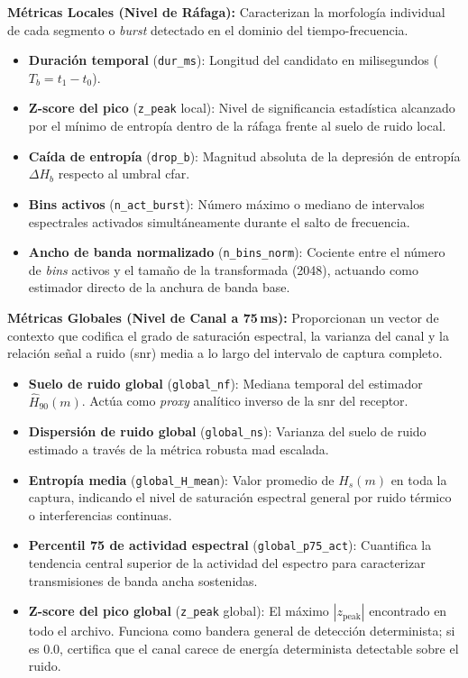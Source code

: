 \textbf{Métricas Locales (Nivel de Ráfaga):}
Caracterizan la morfología individual de cada segmento o \textit{burst} detectado en el dominio del tiempo-frecuencia.
\begin{itemize}\itemsep 0em
    \item \textbf{Duración temporal} (\texttt{dur\_ms}): Longitud del candidato en milisegundos ($T_b = t_1 - t_0$).
    \item \textbf{Z-score del pico} (\texttt{z\_peak} local): Nivel de significancia estadística alcanzado por el mínimo de entropía dentro de la ráfaga frente al suelo de ruido local.
    \item \textbf{Caída de entropía} (\texttt{drop\_b}): Magnitud absoluta de la depresión de entropía $\Delta H_b$ respecto al umbral \gls{cfar}.
    \item \textbf{Bins activos} (\texttt{n\_act\_burst}): Número máximo o mediano de intervalos espectrales activados simultáneamente durante el salto de frecuencia.
    \item \textbf{Ancho de banda normalizado} (\texttt{n\_bins\_norm}): Cociente entre el número de \textit{bins} activos y el tamaño de la transformada (2048), actuando como estimador directo de la anchura de banda base.
\end{itemize}

\textbf{Métricas Globales (Nivel de Canal a 75\,ms):}
Proporcionan un vector de contexto que codifica el grado de saturación espectral, la varianza del canal y la relación señal a ruido (\gls{snr}) media a lo largo del intervalo de captura completo.
\begin{itemize}\itemsep 0em
    \item \textbf{Suelo de ruido global} (\texttt{global\_nf}): Mediana temporal del estimador $\widehat{H}_{90}(m)$. Actúa como \textit{proxy} analítico inverso de la \gls{snr} del receptor.
    \item \textbf{Dispersión de ruido global} (\texttt{global\_ns}): Varianza del suelo de ruido estimado a través de la métrica robusta \gls{mad} escalada.
    \item \textbf{Entropía media} (\texttt{global\_H\_mean}): Valor promedio de $H_s(m)$ en toda la captura, indicando el nivel de saturación espectral general por ruido térmico o interferencias continuas.
    \item \textbf{Percentil 75 de actividad espectral} (\texttt{global\_p75\_act}): Cuantifica la tendencia central superior de la actividad del espectro para caracterizar transmisiones de banda ancha sostenidas.
    \item \textbf{Z-score del pico global} (\texttt{z\_peak} global): El máximo $|z_{\text{peak}}|$ encontrado en todo el archivo. Funciona como bandera general de detección determinista; si es $0.0$, certifica que el canal carece de energía determinista detectable sobre el ruido.
\end{itemize}

